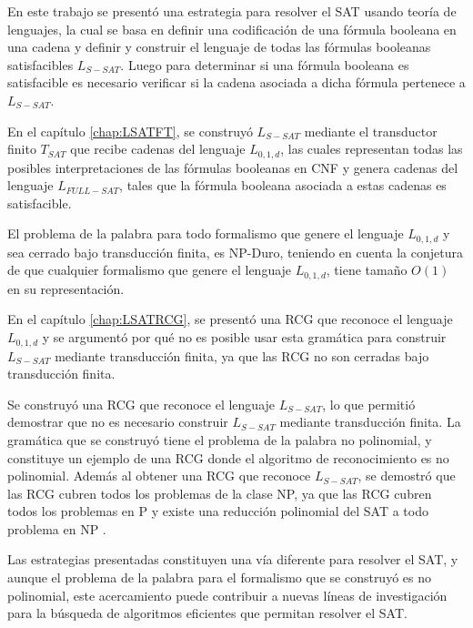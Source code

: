 \begin{conclusions}

    En este trabajo se presentó una estrategia para resolver el SAT usando teoría de lenguajes, la cual se basa en definir
    una codificación de una fórmula booleana en una cadena y definir y construir el lenguaje de todas las fórmulas booleanas
    satisfacibles $L_{S-SAT}$. Luego para determinar si una fórmula booleana es satisfacible es necesario verificar si la cadena asociada
    a dicha fórmula pertenece a $L_{S-SAT}$.
    
    En el capítulo \ref{chap:LSATFT}, se construyó $L_{S-SAT}$ mediante el transductor finito $T_{SAT}$ que recibe
    cadenas del lenguaje $L_{0,1,d}$, las cuales representan todas las posibles interpretaciones de las fórmulas
    booleanas en CNF y genera cadenas del lenguaje $L_{FULL-SAT}$, tales que la fórmula booleana asociada a estas
    cadenas es satisfacible.
    
    El problema de la palabra para todo formalismo que genere
    el lenguaje $L_{0,1,d}$ y sea cerrado bajo transducción finita, es NP-Duro, teniendo en cuenta la conjetura
    de que cualquier formalismo que genere el lenguaje $L_{0,1,d}$, tiene tamaño $O(1)$ en su representación.
    
    En el capítulo \ref{chap:LSATRCG}, se presentó una RCG que reconoce el lenguaje $L_{0,1,d}$ y se argumentó por qué no es posible
    usar esta gramática para construir $L_{S-SAT}$ mediante transducción finita, ya que las RCG no son cerradas bajo transducción finita.
    
    Se construyó una RCG que reconoce el lenguaje $L_{S-SAT}$, lo que permitió demostrar
    que no es necesario construir $L_{S-SAT}$ mediante transducción finita. La gramática que se construyó tiene el problema
    de la palabra no polinomial, y constituye un ejemplo de una RCG donde el algoritmo de reconocimiento es no polinomial.
    Además al obtener una RCG que reconoce $L_{S-SAT}$, se demostró que las RCG cubren todos los problemas de la clase NP,
    ya que las RCG cubren todos los problemas en P \cite{mainRCGBib} y existe una reducción polinomial del SAT a todo problema en NP \cite{authomataTheory}.
    
    Las estrategias presentadas constituyen una vía diferente
    para resolver el SAT, y aunque el problema de la palabra para el formalismo que se construyó es no polinomial,
    este acercamiento puede contribuir a nuevas líneas de investigación para la búsqueda de algoritmos eficientes que permitan
    resolver el SAT.
    
\end{conclusions}
